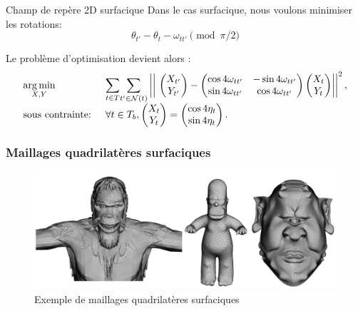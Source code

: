 \begin{frame}{Champ de repère 2D surfacique}
    \small
    Dans le cas surfacique, nous voulons minimiser les rotations:
    $$
        \theta_{t'} - \theta_{t} - \omega_{tt'} \pmod{\pi/2}
    $$

    Le problème d'optimisation devient alors :
    \small{
    \begin{equation*}
    \begin{array}{ll}
    \underset{X, Y}{\argmin} & \underset{t \in T}{\displaystyle\sum} \underset{t' \in \mathcal{N}(t)}{\displaystyle\sum} \left|\left|\ \begin{pmatrix} X_{t'}\\ Y_{t'}\end{pmatrix} - \begin{pmatrix}\cos4\omega_{tt'} & -\sin4\omega_{tt'} \\ \sin4\omega_{tt'} & \cos4\omega_{tt'} \end{pmatrix} \begin{pmatrix} X_{t}\\ Y_{t}\end{pmatrix} \right|\right|^2, \\
    \text{sous contrainte: } & \forall t \in T_b, \begin{pmatrix} X_{t}\\ Y_{t}\end{pmatrix} = \begin{pmatrix} \cos4\eta_t\\ \sin4\eta_t\end{pmatrix}.
    \end{array}
    \end{equation*}
    }
\end{frame}

\begin{frame}
    \frametitle{Maillages quadrilatères surfaciques}
    \begin{figure}
    \centering
    \includegraphics[width=\textwidth]{img/new_images/CG_models.PNG}
    \caption{Exemple de maillages quadrilatères surfaciques}
    \end{figure}
\end{frame}
\fi

